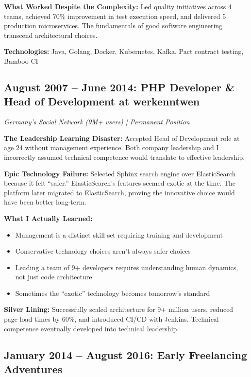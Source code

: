 \documentclass[11pt,a4paper]{article}
\begin{document}
\textbf{What Worked Despite the Complexity:} Led quality initiatives across 4 teams, achieved 70\% improvement in test execution speed, and delivered 5 production microservices. The fundamentals of good software engineering transcend architectural choices.

\textbf{Technologies:} Java, Golang, Docker, Kubernetes, Kafka, Pact contract testing, Bamboo CI

\vspace{4pt}

\subsection{August 2007 -- June 2014: PHP Developer \& Head of Development at werkenntwen}
\textit{Germany's Social Network (9M+ users) | Permanent Position}

\textbf{The Leadership Learning Disaster:} Accepted Head of Development role at age 24 without management experience. Both company leadership and I incorrectly assumed technical competence would translate to effective leadership.

\textbf{Epic Technology Failure:} Selected Sphinx search engine over ElasticSearch because it felt ``safer.'' ElasticSearch's features seemed exotic at the time. The platform later migrated to ElasticSearch, proving the innovative choice would have been better long-term.

\textbf{What I Actually Learned:}
\begin{itemize}[leftmargin=15pt, topsep=0pt, itemsep=1pt]
\item Management is a distinct skill set requiring training and development
\item Conservative technology choices aren't always safer choices
\item Leading a team of 9+ developers requires understanding human dynamics, not just code architecture
\item Sometimes the ``exotic'' technology becomes tomorrow's standard
\end{itemize}

\textbf{Silver Lining:} Successfully scaled architecture for 9+ million users, reduced page load times by 60\%, and introduced CI/CD with Jenkins. Technical competence eventually developed into technical leadership.

\vspace{4pt}

\subsection{January 2014 -- August 2016: Early Freelancing Adventures}
\end{document}

